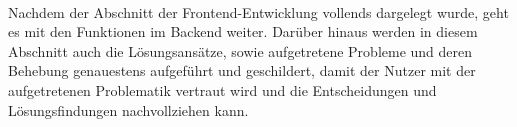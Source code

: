 \pagebreak
\\ 
Nachdem der Abschnitt der Frontend-Entwicklung vollends dargelegt wurde, geht es mit den Funktionen im Backend weiter. Darüber hinaus werden in diesem 
Abschnitt auch die Lösungsansätze, sowie aufgetretene Probleme und deren Behebung genauestens aufgeführt und geschildert, damit der Nutzer mit der 
aufgetretenen Problematik vertraut wird und die Entscheidungen und Lösungsfindungen nachvollziehen kann. 